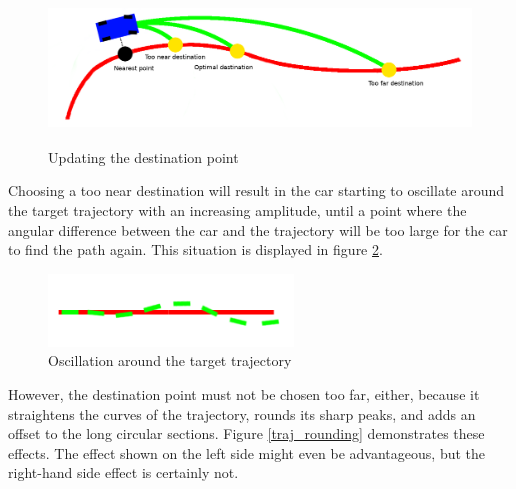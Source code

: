 \begin{figure}[!ht]
    \centering
    \includegraphics[height=40mm]{figures/raw/dest_point_update.png}
    \caption{Updating the destination point}
    \label{dest_point_update}
\end{figure}

Choosing a too near destination will result in the car starting to oscillate around the target trajectory with an increasing amplitude, until a point where the angular difference between the car and the trajectory will be too large for the car to find the path again. This situation is displayed in figure \ref{traj_oscillation}.

\begin{figure}[!ht]
    \centering
    \includegraphics[width=65mm]{figures/raw/traj_oscillation.png}
    \caption{Oscillation around the target trajectory}
    \label{traj_oscillation}
\end{figure}

However, the destination point must not be chosen too far, either, because it straightens the curves of the trajectory, rounds its sharp peaks, and adds an offset to the long circular sections. Figure \ref{traj_rounding} demonstrates these effects. The effect shown on the left side might even be advantageous, but the right-hand side effect is certainly not.

